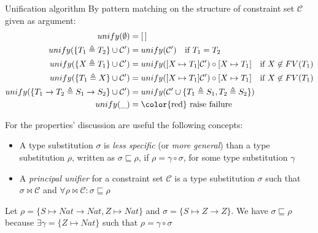 \documentclass[8pt]{beamer}
\begin{document}
\begin{frame}
    \begin{block}{Unification algorithm}
        By pattern matching on the structure of constraint set $\mathcal{C}$
        given as argument:
        \begin{displaymath}
            \begin{split}
                unify(\emptyset) &= [\,] \\
                unify(\{T_1 \triangleq T_2\} \cup \mathcal{C}^{\prime}) &=
                    unify(\mathcal{C}^{\prime})
                    \quad \text{if } T_1 = T_2\\
                unify(\{X \triangleq T_1\} \cup \mathcal{C}^{\prime}) &=
                    unify([ X \mapsto T_1]\mathcal{C}^{\prime}) \circ [X \mapsto T_1]
                    \quad \text{if } X \not \in FV(T_1)\\
                unify(\{T_1 \triangleq X\} \cup \mathcal{C}^{\prime}) &=
                    unify([ X \mapsto T_1]\mathcal{C}^{\prime}) \circ [X \mapsto T_1]
                    \quad \text{if } X \not \in FV(T_1)\\
                unify(\{T_1 \rightarrow T_2 \triangleq S_1\rightarrow S_2 \} 
                    \cup \mathcal{C}^{\prime}) &=
                    unify(\mathcal{C}^{\prime} \cup \{T_1 \triangleq S_1,
                        T_2 \triangleq S_2\}) \\
                unify(\_) &= \text{\color{red} raise failure}\\
            \end{split}
        \end{displaymath}
    \end{block}
    \pause
    For the properties' discussion are useful the following concepts:
    \begin{itemize}
        \item   A type substitution $\sigma$ is \emph{less specific} (or 
                \emph{more general}) than a type substitution $\rho$, written
                as $\sigma \sqsubseteq \rho$, if $\rho = \gamma \circ \sigma$,
                for some type substitution $\gamma$
        \item   A \emph{principal unifier} for a constraint set $\mathcal{C}$ 
                is a type substitution $\sigma$ such that $\sigma \Join \mathcal{C}$
                and $\forall \rho \Join \mathcal{C}: \sigma \sqsubseteq \rho$
    \end{itemize}
    \begin{example}
        Let $\rho = \{S \mapsto Nat \rightarrow Nat, Z \mapsto Nat\}$ 
        and $\sigma = \{S \mapsto Z \rightarrow Z\}$. We have $\sigma 
        \sqsubseteq \rho$ because $\exists \gamma = \{Z \mapsto Nat\}$ 
        such that $\rho = \gamma \circ \sigma$
    \end{example}
\end{frame}
\end{document}
